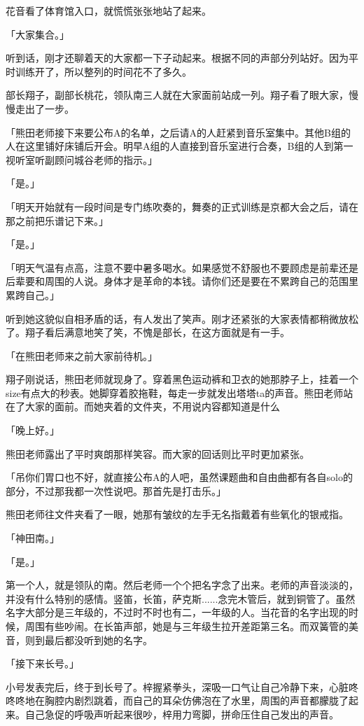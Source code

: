 \documentclass[UTF8]{ctexart}
\begin{document}
    花音看了体育馆入口，就慌慌张张地站了起来。

    「大家集合。」

    听到话，刚才还聊着天的大家都一下子动起来。根据不同的声部分列站好。因为平时训练开了，所以整列的时间花不了多久。

    部长翔子，副部长桃花，领队南三人就在大家面前站成一列。翔子看了眼大家，慢慢走出了一步。

    「熊田老师接下来要公布A的名单，之后请A的人赶紧到音乐室集中。其他B组的人在这里铺好床铺后开会。明早A组的人直接到音乐室进行合奏，B组的人到第一视听室听副顾问城谷老师的指示。」

    「是。」

    「明天开始就有一段时间是专门练吹奏的，舞奏的正式训练是京都大会之后，请在那之前把乐谱记下来。」

    「是。」

    「明天气温有点高，注意不要中暑多喝水。如果感觉不舒服也不要顾虑是前辈还是后辈要和周围的人说。身体才是革命的本钱。请你们还是要在不累跨自己的范围里累跨自己。」

    听到她这貌似自相矛盾的话，有人发出了笑声。刚才还紧张的大家表情都稍微放松了。翔子看后满意地笑了笑，不愧是部长，在这方面就是有一手。

    「在熊田老师来之前大家前待机。」

    翔子刚说话，熊田老师就现身了。穿着黑色运动裤和卫衣的她那脖子上，挂着一个size有点大的秒表。她脚穿着胶拖鞋，每走一步就发出塔塔ta的声音。熊田老师站在了大家的面前。而她夹着的文件夹，不用说内容都知道是什么

    「晚上好。」

    熊田老师露出了平时爽朗那样笑容。而大家的回话则比平时更加紧张。

    「吊你们胃口也不好，就直接公布A的人吧，虽然课题曲和自由曲都有各自solo的部分，不过那我都一次性说吧。那首先是打击乐。」

    熊田老师往文件夹看了一眼，她那有皱纹的左手无名指戴着有些氧化的银戒指。

    「神田南。」

    「是。」

    第一个人，就是领队的南。然后老师一个个把名字念了出来。老师的声音淡淡的，并没有什么特别的感情。竖笛，长笛，萨克斯......念完木管后，就到铜管了。虽然名字大部分是三年级的，不过时不时也有二，一年级的人。当花音的名字出现的时候，周围有些吵闹。在长笛声部，她是与三年级生拉开差距第三名。而双簧管的美音，则到最后都没听到她的名字。

    「接下来长号。」

    小号发表完后，终于到长号了。梓握紧拳头，深吸一口气让自己冷静下来，心脏咚咚咚地在胸腔内剧烈跳着，而自己的耳朵仿佛泡在了水里，周围的声音都朦胧了起来。自己急促的呼吸声听起来很吵，梓用力弯脚，拼命压住自己发出的声音。
\end{document}
